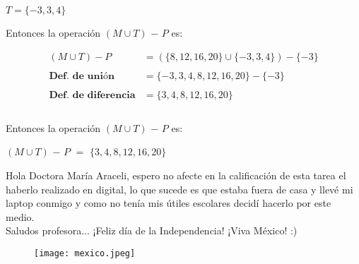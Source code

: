 \documentclass[12pt]{article}
\begin{document}
\begin{center}
   $T = \{-3, 3, 4\}$
\end{center}

Entonces la operación $(M \cup T)$ $-$ $P$ es:

\begin{equation}
    \begin{split}
        (M \cup T) - P & = (\{8, 12, 16, 20\} \cup \{-3, 3, 4\})-\{-3\}  \\\\ \textbf{Def. de unión}
         & =  \{-3, 3, 4, 8, 12, 16, 20\} - \{-3\}\\\\ \textbf{Def. de diferencia}
        & =  \{3, 4, 8, 12, 16, 20\} \\\\
    \end{split}
\end{equation}

Entonces la operación $(M \cup T)$ $-$ $P$ es:

\begin{center}
    $(M \cup T)$ $-$ $P$ $=$  $\{3, 4, 8, 12, 16, 20\}$
\end{center}

\newpage
Hola Doctora María Araceli, espero no afecte en la calificación de esta tarea el haberlo realizado en digital, lo que sucede es que estaba fuera de casa y llevé mi laptop conmigo y como no tenía mis útiles escolares decidí hacerlo por este medio.\\

Saludos profesora... ¡Feliz día de la Independencia! ¡Viva México! :) \\

\begin{figure}[htb] \centering \texttt{[image: mexico.jpeg]} \end{figure}
\end{document}
